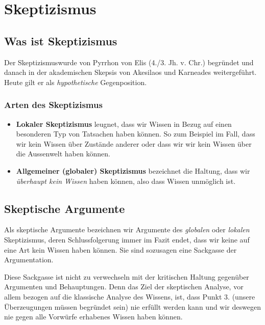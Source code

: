 \documentclass[../main.tex]{subfiles}
\begin{document}
\section{Skeptizismus}
\subsection{Was ist Skeptizismus} 
Der Skeptizismuswurde von Pyrrhon von Elis (4./3. Jh. v. Chr.) begründet und danach in der akademischen Skepsis von Akesilaos und Karneades weitergeführt. Heute gilt er als \textit{hypothetische} Gegenposition.

\subsubsection{Arten des Skeptizismus}
\begin{itemize}
	\item \textbf{Lokaler Skeptizismus} leugnet, dass wir Wissen in Bezug auf einen besonderen Typ von Tatsachen haben können. So zum Beispiel im Fall, dass wir kein Wissen über Zustände anderer oder dass wir wir kein Wissen über die Aussenwelt haben können. 
	\item \textbf{Allgemeiner (globaler) Skeptizismus} bezeichnet die Haltung, dass wir \textit{überhaupt kein Wissen} haben können, also dass Wissen unmöglich ist. 
\end{itemize}

\subsection{Skeptische Argumente}
Als skeptische Argumente bezeichnen wir Argumente des \textit{globalen} oder \textit{lokalen} Skeptizismus, deren Schlussfolgerung immer im Fazit endet, dass wir keine auf eine Art kein Wissen haben können. Sie sind sozusagen eine Sackgasse der Argumentation. 

Diese Sackgasse ist nicht zu verwechseln mit der kritischen Haltung gegenüber Argumenten und Behauptungen. Denn das Ziel der skeptischen Analyse, vor allem bezogen auf die klassische Analyse des Wissens, ist, dass Punkt 3. (unsere Überzeugungen müssen begründet sein) nie erfüllt werden kann und wir deswegen nie gegen alle Vorwürfe erhabenes Wissen haben können. 
\end{document}
